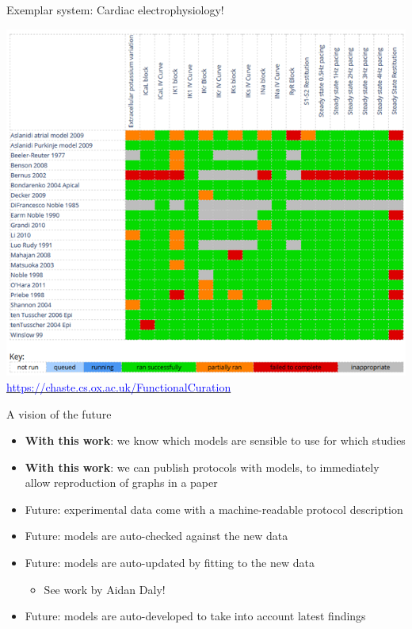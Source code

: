 \documentclass[t,xcolor={usenames,dvipsnames}]{beamer}
\newcommand{\myhref}[2]{\href{#1}{\textcolor{Blue}{#2}}}
\newcommand{\myurl}[1]{\myhref{#1}{#1}}
\newcommand{\subitem}[1]{\begin{itemize}[<.->]\item #1 \end{itemize}}
\begin{document}
\begin{frame}{Exemplar system: Cardiac electrophysiology!}
\begin{center}
\vspace{-.5cm}
\includegraphics[height=.8\textheight]{cardiac_fc_matrix}\\
\myurl{https://chaste.cs.ox.ac.uk/FunctionalCuration}
\end{center}
\end{frame}


\begin{frame}{A vision of the future}
\begin{itemize}
\item \textbf{With this work}: we know which models are sensible to use for which studies
\item \textbf{With this work}: we can publish protocols with models, to immediately allow reproduction of graphs in a paper
\item Future: experimental data come with a machine-readable protocol description
\item Future: models are auto-checked against the new data
\item Future: models are auto-updated by fitting to the new data
  \subitem{See work by Aidan Daly!}
\item Future: models are auto-developed to take into account latest findings
\end{itemize}
\end{frame}
\end{document}
